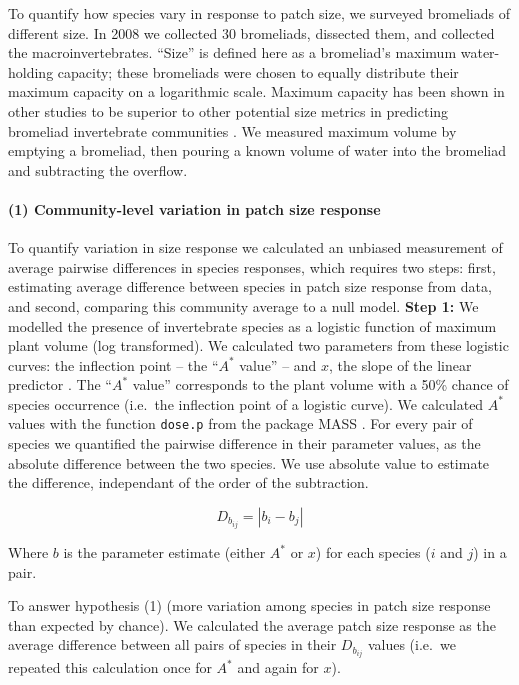To quantify how species vary in response to patch size, we surveyed
bromeliads of different size. In 2008 we collected 30 bromeliads,
dissected them, and collected the macroinvertebrates. ``Size'' is defined here as a bromeliad's maximum water-holding capacity; these bromeliads
were chosen to equally distribute their maximum capacity on a logarithmic
scale. Maximum capacity has been shown in other
studies to be superior to other potential size metrics in predicting
bromeliad invertebrate communities \citep{Srivastava2008, Marino2011}.
We measured maximum volume by emptying a bromeliad, then pouring a known
volume of water into the bromeliad and subtracting the overflow.

\paragraph{(1) Community-level variation in patch size
response}\label{community-level-variation-in-patch-size-response}

To quantify variation in size response we calculated an unbiased
measurement of average pairwise differences in species responses, which
requires two steps: first, estimating average difference between species
in patch size response from data, and second, comparing this community
average to a null model. \textbf{Step 1:} We modelled the presence of
invertebrate species as a logistic function of maximum plant volume (log
transformed). We calculated two parameters from these logistic curves: the inflection point -- the
``\(A^{*}\) value'' -- and \(x\), the slope of the linear predictor
\citep{Ovaskainen2003}. The ``\(A^{*}\) value'' corresponds to the plant
volume with a 50\% chance of species occurrence (i.e.~the inflection
point of a logistic curve). We calculated \(A^{*}\) values with the function
\texttt{dose.p} from the package MASS \citep{mass}. For every pair of species we quantified the
pairwise difference in their parameter values, as the absolute
difference between the two species. We use absolute value to estimate the difference, independant of the order of the subtraction.

\[D_{b_{ij}} = |b_{i} - b_{j}|\]

Where \(b\) is the parameter estimate (either \(A^{*}\) or \(x\)) for
each species (\(i\) and \(j\)) in a pair.

To answer hypothesis (1) (more variation among species
in patch size response than expected by chance). We calculated the average patch size response as the average difference
between all pairs of species in their \(D_{b_{ij}}\) values (i.e.~we repeated this calculation once for \(A^{*}\) and again for \(x\)).

